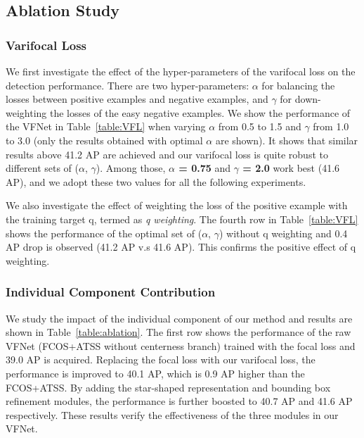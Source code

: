 \vspace{0.3mm}
\subsection{Ablation Study}
\subsubsection{Varifocal Loss}
We first investigate the effect of the hyper-parameters of the varifocal loss on the detection performance. There are two hyper-parameters: \textbf{$\alpha$} for balancing the losses between positive examples and negative examples, and \textbf{$\gamma$} for down-weighting the losses of the easy negative examples. 
We show the performance of the VFNet in Table~\ref{table:VFL} when varying $\alpha$ from 0.5 to 1.5 and $\gamma$ from 1.0 to 3.0 (only the results obtained with optimal $\alpha$  are shown). It shows that similar results above 41.2 AP are achieved and our varifocal loss is quite robust to different sets of ($\alpha$, $\gamma$). Among those, \textbf{$\alpha$ = 0.75} and \textbf{$\gamma$ = 2.0} work best (41.6 AP), and we adopt these two values for all the following experiments.

We also investigate the effect of weighting the loss of the positive example with the training target q, termed as \textit{q weighting}. The fourth row in Table~\ref{table:VFL} shows the performance of the optimal set of ($\alpha$, $\gamma$) without q weighting and 0.4 AP drop is observed (41.2 AP v.s 41.6 AP). This confirms the positive effect of q weighting.

\vspace{-3mm}
\subsubsection{Individual Component Contribution}

We study the impact of the individual component of our method and results are shown in Table~\ref{table:ablation}. The first row shows the performance of the raw VFNet (FCOS+ATSS without centerness branch) trained with the focal loss and 39.0 AP is acquired. Replacing the focal loss with our varifocal loss, the performance is improved to 40.1 AP, which is 0.9 AP higher than the FCOS+ATSS. By adding the star-shaped representation and bounding box refinement modules, the performance is further boosted to 40.7 AP and 41.6 AP respectively. These results verify the effectiveness of the three modules in our VFNet. 




